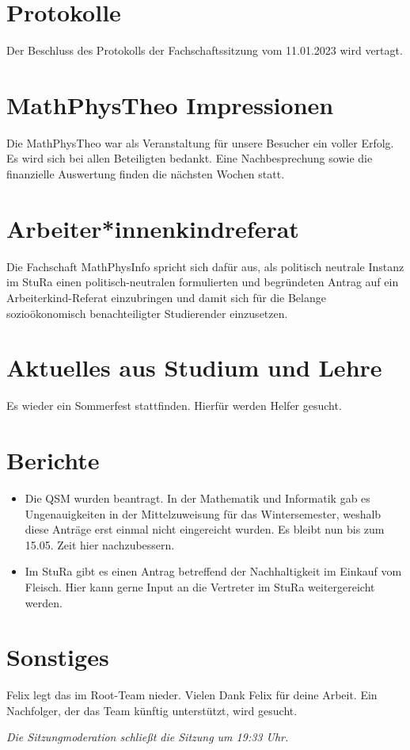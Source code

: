 \documentclass[11pt, twosided=true]{mathphys-protocol}
\renewcommand{\sende}{19:33 Uhr}
\begin{document}
\maketitlepage



\section{Protokolle}
    Der Beschluss des Protokolls der Fachschaftssitzung vom 11.01.2023 wird vertagt.


\section{MathPhysTheo Impressionen}
Die MathPhysTheo war als Veranstaltung für unsere Besucher ein voller Erfolg. Es wird sich bei allen Beteiligten bedankt. Eine Nachbesprechung sowie die finanzielle Auswertung finden die nächsten Wochen statt.

\section{Arbeiter*innenkindreferat }
Die Fachschaft MathPhysInfo spricht sich dafür aus, als politisch neutrale Instanz im StuRa einen politisch-neutralen formulierten und begründeten Antrag auf ein Arbeiterkind-Referat einzubringen und damit sich für die Belange sozioökonomisch benachteiligter Studierender einzusetzen.

\section{Aktuelles aus Studium und Lehre}
Es wieder ein Sommerfest stattfinden. Hierfür werden Helfer gesucht.

\section{Berichte}
    \begin{itemize}
        \item Die QSM wurden beantragt. In der Mathematik und Informatik gab es Ungenauigkeiten in der Mittelzuweisung für das Wintersemester, weshalb diese Anträge erst einmal nicht eingereicht wurden. Es bleibt nun bis zum 15.05. Zeit hier nachzubessern.
        \item Im StuRa gibt es einen Antrag betreffend der Nachhaltigkeit im Einkauf vom Fleisch. Hier kann gerne Input an die Vertreter im StuRa weitergereicht werden.
    \end{itemize}

\section{Sonstiges}
Felix legt das im Root-Team nieder. Vielen Dank Felix für deine Arbeit.
Ein Nachfolger, der das Team künftig unterstützt, wird gesucht.

\emph{Die Sitzungmoderation schließt die Sitzung um \sende.}
\end{document}
